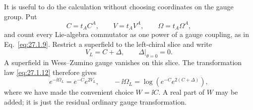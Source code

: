 \ExerciseEditorialNote

\begin{enumerate}
  It is useful to do the calculation without choosing coordinates on the
  gauge group.  Put
  \[
    C=t_AC^A,\qquad V=t_AV^A,\qquad \Omega=t_A\Omega^A ,
  \]
  and count every Lie-algebra commutator as one power of a gauge coupling,
  as in Eq.~\eqref{eq:27.1.9}.  Restrict a superfield to the left-chiral
  slice and write
  \[
    V_L=C+\Delta,\qquad \Delta|_{\theta=0}=0 .
  \]
  A superfield in Wess--Zumino gauge vanishes on this slice.  The
  transformation law \eqref{eq:27.1.12} therefore gives
  \[
    e^{-\ii\Omega_L}=e^{-C}e^{2V_L},\qquad
    -\ii\Omega_L=\log\!\left(e^{-C}e^{2(C+\Delta)}\right),
    \tag{1}
  \]
  where we have made the convenient choice \(W=\ii C\).  A real part of
  \(W\) may be added; it is just the residual ordinary gauge
  transformation.


\end{enumerate}
